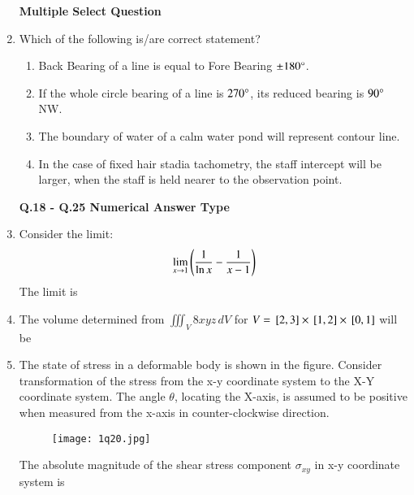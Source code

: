 \documentclass[journal,12pt,onecolumn]{article}
\theoremstyle{remark}
\begin{document}
\begin{enumerate}
\textbf{Multiple Select Question}

\item Which of the following is/are correct statement?
\hfill{}
\begin{enumerate}
    \item Back Bearing of a line is equal to Fore Bearing $\pm 180\degree$.
    \item If the whole circle bearing of a line is $270\degree$, its reduced bearing is $90\degree$ NW.
    \item The boundary of water of a calm water pond will represent contour line.
    \item In the case of fixed hair stadia tachometry, the staff intercept will be larger, when the staff is held nearer to the observation point.
\end{enumerate}

\textbf{Q.18 - Q.25 Numerical Answer Type}

\item Consider the limit:
\begin{align}
\lim_{x \to 1} \left(\frac{1}{\ln x} - \frac{1}{x-1}\right)
\end{align}
The limit  is \underline{\hspace{2cm}}

\hfill{}

\item The volume determined from $\iiint_V 8xyz \,dV$ for $V = {}\left[2, 3\right] \times {}\left[1, 2\right] \times {}\left[0, 1\right]$ will be  \underline{\hspace{2cm}}

\hfill{}

\item The state of stress in a deformable body is shown in the figure. Consider transformation of the stress from the x-y coordinate system to the X-Y coordinate system. The angle $\theta$, locating the X-axis, is assumed to be positive when measured from the x-axis in counter-clockwise direction.
\begin{figure}[H]
    \centering
    \texttt{[image: 1q20.jpg]}
    \caption{}
    \label{fig:q20}
\end{figure}
The absolute magnitude of the shear stress component $\sigma_{xy}$  in x-y coordinate system is \underline{\hspace{2cm}}


\end{enumerate}
\end{document}

